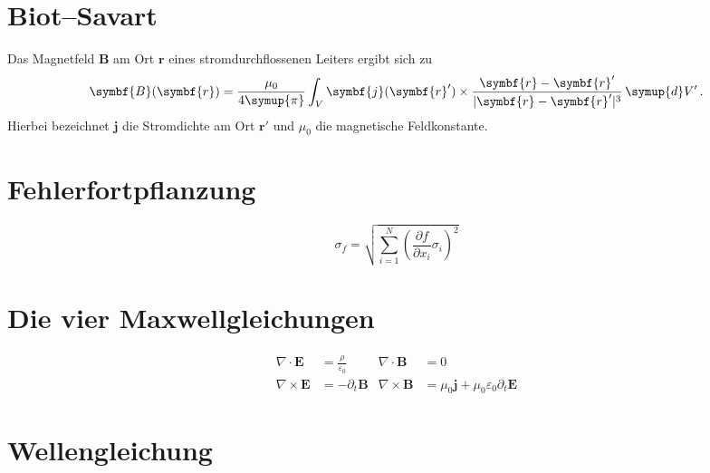 \documentclass{scrartcl}
\begin{document}
\section{Biot--Savart}

Das Magnetfeld $\symbf{B}$ am Ort $\symbf{r}$ eines stromdurchflossenen Leiters
ergibt sich zu
\begin{equation}
  \symbf{B}(\symbf{r}) = \frac{\mu_0}{4 \symup{\pi}}
    \int_V \symbf{j}(\symbf{r}') \times
      \frac{\symbf{r} - \symbf{r}'}{\lvert \symbf{r} - \symbf{r}' \rvert^3}
      \, \symup{d}V' \, .
\end{equation}
Hierbei bezeichnet $\symbf{j}$ die Stromdichte am Ort $\symbf{r}'$
und $\mu_0$ die magnetische Feldkonstante.

\section{Fehlerfortpflanzung}

\begin{equation}
  \sigma_f = \sqrt{
    \sum_{i = 1}^N
      \left( \frac{\partial f}{\partial x_i} \sigma_i \right)^{\!\! 2}
  }
\end{equation}

\section{Die vier Maxwellgleichungen}

\begin{align}
  \nabla \cdot \symbf{E} &= \frac{\rho}{\varepsilon_0} &
  \nabla \cdot \symbf{B} &= 0 \\
  \nabla \times \symbf{E} &= - \partial_t \symbf{B} &
  \nabla \times \symbf{B} &= \mu_0 \symbf{j} + \mu_0 \varepsilon_0 \partial_t \symbf{E}
\end{align}

\section{Wellengleichung}
\end{document}
